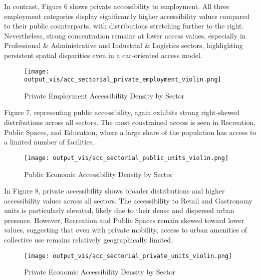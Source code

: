 \documentclass[
  12pt,
]{report}
\begin{document}
In contrast, Figure 6 shows private accessibility to employment. All
three employment categories display significantly higher accessibility
values compared to their public counterparts, with distributions
stretching further to the right. Nevertheless, strong concentration
remains at lower access values, especially in Professional \&
Administrative and Industrial \& Logistics sectors, highlighting
persistent spatial disparities even in a car-oriented access model.

\begin{figure}[H]

{\centering \texttt{[image: output\_vis/acc\_sectorial\_private\_employment\_violin.png]}

}

\caption{Private Employment Accessibility Density by Sector}

\end{figure}%

Figure 7, representing public accessibility, again exhibits strong
right-skewed distributions across all sectors. The most constrained
access is seen in Recreation, Public Spaces, and Education, where a
large share of the population has access to a limited number of
facilities.

\begin{figure}[H]

{\centering \texttt{[image: output\_vis/acc\_sectorial\_public\_units\_violin.png]}

}

\caption{Public Economic Accessibility Density by Sector}

\end{figure}%

In Figure 8, private accessibility shows broader distributions and
higher accessibility values across all sectors. The accessibility to
Retail and Gastronomy units is particularly elevated, likely due to
their dense and dispersed urban presence. However, Recreation and Public
Spaces remain skewed toward lower values, suggesting that even with
private mobility, access to urban amenities of collective use remains
relatively geographically limited.

\begin{figure}[H]

{\centering \texttt{[image: output\_vis/acc\_sectorial\_private\_units\_violin.png]}

}

\caption{Private Economic Accessibility Density by Sector}

\end{figure}%
\end{document}
